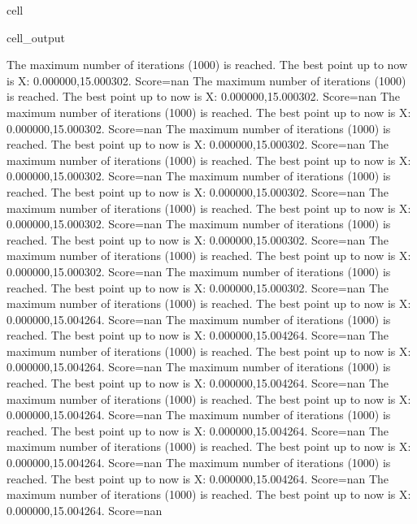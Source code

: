 \documentclass[letterpaper,10pt,english]{jupyterBook}
\begin{document}
\begin{sphinxuseclass}{cell}
\begin{sphinxVerbatimOutput}
\begin{sphinxuseclass}{cell_output}
\begin{sphinxVerbatim}[commandchars=\\\{\}]
The maximum number of iterations (1000) is reached. The best point up to now is X: \PYGZob{}0.000000,15.000302\PYGZcb{}. Score=\PYGZhy{}nan
The maximum number of iterations (1000) is reached. The best point up to now is X: \PYGZob{}0.000000,15.000302\PYGZcb{}. Score=\PYGZhy{}nan
The maximum number of iterations (1000) is reached. The best point up to now is X: \PYGZob{}0.000000,15.000302\PYGZcb{}. Score=\PYGZhy{}nan
The maximum number of iterations (1000) is reached. The best point up to now is X: \PYGZob{}0.000000,15.000302\PYGZcb{}. Score=\PYGZhy{}nan
The maximum number of iterations (1000) is reached. The best point up to now is X: \PYGZob{}0.000000,15.000302\PYGZcb{}. Score=\PYGZhy{}nan
The maximum number of iterations (1000) is reached. The best point up to now is X: \PYGZob{}0.000000,15.000302\PYGZcb{}. Score=\PYGZhy{}nan
The maximum number of iterations (1000) is reached. The best point up to now is X: \PYGZob{}0.000000,15.000302\PYGZcb{}. Score=\PYGZhy{}nan
The maximum number of iterations (1000) is reached. The best point up to now is X: \PYGZob{}0.000000,15.000302\PYGZcb{}. Score=\PYGZhy{}nan
The maximum number of iterations (1000) is reached. The best point up to now is X: \PYGZob{}0.000000,15.000302\PYGZcb{}. Score=\PYGZhy{}nan
The maximum number of iterations (1000) is reached. The best point up to now is X: \PYGZob{}0.000000,15.000302\PYGZcb{}. Score=\PYGZhy{}nan
The maximum number of iterations (1000) is reached. The best point up to now is X: \PYGZob{}0.000000,15.004264\PYGZcb{}. Score=\PYGZhy{}nan
The maximum number of iterations (1000) is reached. The best point up to now is X: \PYGZob{}0.000000,15.004264\PYGZcb{}. Score=\PYGZhy{}nan
The maximum number of iterations (1000) is reached. The best point up to now is X: \PYGZob{}0.000000,15.004264\PYGZcb{}. Score=\PYGZhy{}nan
The maximum number of iterations (1000) is reached. The best point up to now is X: \PYGZob{}0.000000,15.004264\PYGZcb{}. Score=\PYGZhy{}nan
The maximum number of iterations (1000) is reached. The best point up to now is X: \PYGZob{}0.000000,15.004264\PYGZcb{}. Score=\PYGZhy{}nan
The maximum number of iterations (1000) is reached. The best point up to now is X: \PYGZob{}0.000000,15.004264\PYGZcb{}. Score=\PYGZhy{}nan
The maximum number of iterations (1000) is reached. The best point up to now is X: \PYGZob{}0.000000,15.004264\PYGZcb{}. Score=\PYGZhy{}nan
The maximum number of iterations (1000) is reached. The best point up to now is X: \PYGZob{}0.000000,15.004264\PYGZcb{}. Score=\PYGZhy{}nan
The maximum number of iterations (1000) is reached. The best point up to now is X: \PYGZob{}0.000000,15.004264\PYGZcb{}. Score=\PYGZhy{}nan

\end{sphinxVerbatim}
\end{sphinxuseclass}
\end{sphinxVerbatimOutput}
\end{sphinxuseclass}
\end{document}

